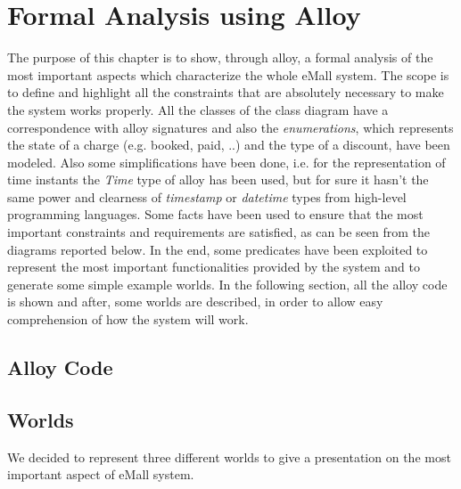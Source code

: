 \documentclass[a4paper]{report}
\begin{document}
\chapter{Formal Analysis using Alloy}
The purpose of this chapter is to show, through alloy, a formal analysis of the most important aspects which characterize the whole eMall system. The scope is to define and highlight all the constraints that are absolutely necessary to make the system works properly. All the classes of the class diagram have a correspondence with alloy signatures and also the \textit{enumerations}, which represents the state of a charge (e.g. booked, paid, ..) and the type of a discount, have been modeled. Also some simplifications have been done, i.e. for the representation of time instants the \textit{Time} type of alloy has been used, but for sure it hasn't the same power and clearness of \textit{timestamp} or \textit{datetime} types from high-level programming languages. Some facts have been used to ensure that the most important constraints and requirements are satisfied, as can be seen from the diagrams reported below. In the end, some predicates have been exploited to represent the most important functionalities provided by the system and to generate some simple example worlds. In the following section, all the alloy code is shown and after, some worlds are described, in order to allow easy comprehension of how the system will work.
\section{Alloy Code}


\section{Worlds}
We decided to represent three different worlds to give a presentation on the most important aspect of eMall system.
\end{document}
